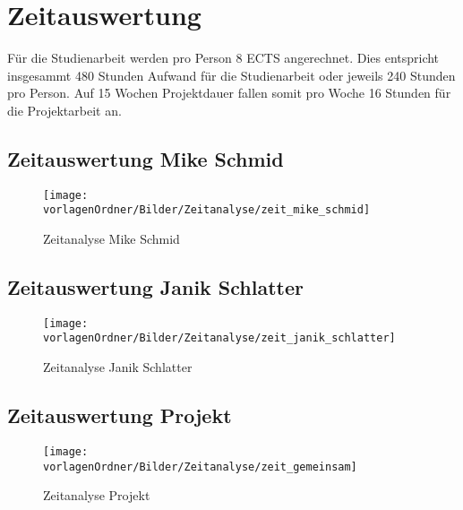 \documentclass[]{subfiles}
\begin{document}
\section{Zeitauswertung}
Für die Studienarbeit werden pro Person 8 ECTS angerechnet.
Dies entspricht insgesammt 480 Stunden Aufwand für die Studienarbeit oder 
jeweils 240 Stunden pro Person.
Auf 15 Wochen Projektdauer fallen somit pro Woche 16 Stunden für die Projektarbeit an.

\subsection{Zeitauswertung Mike Schmid}
\begin{figure}[h!]
    \begin{center}
        \texttt{[image: \\vorlagenOrdner/Bilder/Zeitanalyse/zeit\_mike\_schmid]}
    \end{center}
    \caption{Zeitanalyse Mike Schmid}
\end{figure}

\subsection{Zeitauswertung Janik Schlatter}
\begin{figure}[h!]
    \begin{center}
        \texttt{[image: \\vorlagenOrdner/Bilder/Zeitanalyse/zeit\_janik\_schlatter]}
    \end{center}
    \caption{Zeitanalyse Janik Schlatter}
\end{figure}

\newpage

\subsection{Zeitauswertung Projekt}
\begin{figure}[h!]
    \begin{center}
        \texttt{[image: \\vorlagenOrdner/Bilder/Zeitanalyse/zeit\_gemeinsam]}
    \end{center}
    \caption{Zeitanalyse Projekt}
\end{figure}
\end{document}
